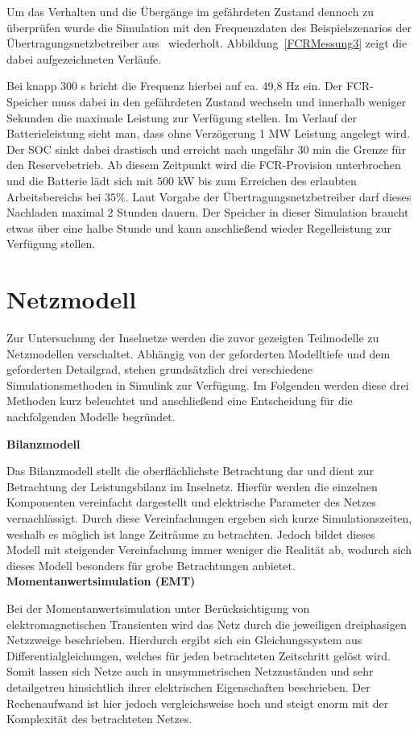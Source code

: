 Um das Verhalten und die Übergänge im gefährdeten Zustand dennoch zu überprüfen wurde die Simulation mit den Frequenzdaten
des Beispielszenarios der Übertragungsnetzbetreiber aus~\parencite[]{Reservebetrieb} wiederholt.
Abbildung~\ref{FCRMessung3} zeigt die dabei aufgezeichneten Verläufe.

Bei knapp 300 s bricht die Frequenz hierbei auf ca. 49,8 Hz ein.
Der FCR-Speicher muss dabei in den gefährdeten Zustand wechseln und innerhalb weniger Sekunden
die maximale Leistung zur Verfügung stellen.
Im Verlauf der Batterieleistung sieht man, dass ohne Verzögerung 1 MW Leistung angelegt wird.
Der SOC sinkt dabei drastisch und erreicht nach ungefähr 30 min die Grenze für den Reservebetrieb.
Ab diesem Zeitpunkt wird die FCR-Provision unterbrochen und die Batterie lädt sich mit $500$ kW 
bis zum Erreichen des erlaubten Arbeitsbereichs bei $35 \%$.
Laut Vorgabe der Übertragungsnetzbetreiber darf dieses Nachladen maximal 2 Stunden dauern.
Der Speicher in dieser Simulation braucht etwas über eine halbe Stunde und kann anschließend wieder
Regelleistung zur Verfügung stellen.

\section{Netzmodell}

Zur Untersuchung der Inselnetze werden die zuvor gezeigten Teilmodelle zu Netzmodellen verschaltet. Abhängig von der geforderten Modelltiefe und dem geforderten Detailgrad, stehen grundsätzlich drei verschiedene Simulationsmethoden in Simulink zur Verfügung. Im Folgenden werden diese drei Methoden kurz beleuchtet und anschließend eine Entscheidung für die nachfolgenden Modelle begründet.

\textbf{Bilanzmodell}

Das Bilanzmodell stellt die oberflächlichste Betrachtung dar und dient zur Betrachtung der Leistungsbilanz im Inselnetz. Hierfür werden die einzelnen Komponenten vereinfacht dargestellt und elektrische Parameter des Netzes vernachlässigt. Durch diese Vereinfachungen ergeben sich kurze Simulationszeiten, weshalb es möglich ist lange Zeiträume zu betrachten. Jedoch bildet dieses Modell mit steigender Vereinfachung immer weniger die Realität ab, wodurch sich dieses Modell besonders für grobe Betrachtungen anbietet.
\textbf{Momentanwertsimulation (EMT)}

Bei der Momentanwertsimulation unter Berücksichtigung von elektromagnetischen Transienten wird das Netz durch die jeweiligen dreiphasigen Netzzweige beschrieben. Hierdurch ergibt sich ein Gleichungssystem aus Differentialgleichungen, welches für jeden betrachteten Zeitschritt gelöst wird. Somit lassen sich Netze auch in unsymmetrischen Netzzuständen und sehr detailgetreu hinsichtlich ihrer elektrischen Eigenschaften beschrieben. Der Rechenaufwand ist hier jedoch vergleichsweise hoch und steigt enorm mit der Komplexität des betrachteten Netzes. \cite{Simulationsmethoden}

